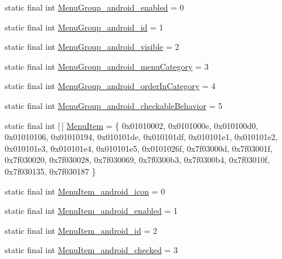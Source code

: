 \begin{DoxyCompactItemize}
\item 
static final int \mbox{\hyperlink{classcom_1_1google_1_1android_1_1gms_1_1R_1_1styleable_a0d0d93ce83d33ae85f11bd37a00a0e97}{Menu\+Group\+\_\+android\+\_\+enabled}} = 0
\item 
static final int \mbox{\hyperlink{classcom_1_1google_1_1android_1_1gms_1_1R_1_1styleable_a0241e87972e95cdfb6fa2d8509b2a525}{Menu\+Group\+\_\+android\+\_\+id}} = 1
\item 
static final int \mbox{\hyperlink{classcom_1_1google_1_1android_1_1gms_1_1R_1_1styleable_a8642e3016f1d1a7b9fb7c67e0c444eb4}{Menu\+Group\+\_\+android\+\_\+visible}} = 2
\item 
static final int \mbox{\hyperlink{classcom_1_1google_1_1android_1_1gms_1_1R_1_1styleable_a2859c9f2a2b60b943ef88d02bb61e9d7}{Menu\+Group\+\_\+android\+\_\+menu\+Category}} = 3
\item 
static final int \mbox{\hyperlink{classcom_1_1google_1_1android_1_1gms_1_1R_1_1styleable_abb8290ec3f838084d0e7e2f9d9672006}{Menu\+Group\+\_\+android\+\_\+order\+In\+Category}} = 4
\item 
static final int \mbox{\hyperlink{classcom_1_1google_1_1android_1_1gms_1_1R_1_1styleable_af4112e6aae6cbf95ad1482e7c0ccd433}{Menu\+Group\+\_\+android\+\_\+checkable\+Behavior}} = 5
\item 
static final int \mbox{[}$\,$\mbox{]} \mbox{\hyperlink{classcom_1_1google_1_1android_1_1gms_1_1R_1_1styleable_a7c676b544f8b0bffbf835502234a7e76}{Menu\+Item}} = \{ 0x01010002, 0x0101000e, 0x010100d0, 0x01010106, 0x01010194, 0x010101de, 0x010101df, 0x010101e1, 0x010101e2, 0x010101e3, 0x010101e4, 0x010101e5, 0x0101026f, 0x7f03000d, 0x7f03001f, 0x7f030020, 0x7f030028, 0x7f030069, 0x7f0300b3, 0x7f0300b4, 0x7f03010f, 0x7f030135, 0x7f030187 \}
\item 
static final int \mbox{\hyperlink{classcom_1_1google_1_1android_1_1gms_1_1R_1_1styleable_a2782035c48daea648fd5e9d8ff9679d6}{Menu\+Item\+\_\+android\+\_\+icon}} = 0
\item 
static final int \mbox{\hyperlink{classcom_1_1google_1_1android_1_1gms_1_1R_1_1styleable_ac7d5804c964342b5bf9b2e9257d050c4}{Menu\+Item\+\_\+android\+\_\+enabled}} = 1
\item 
static final int \mbox{\hyperlink{classcom_1_1google_1_1android_1_1gms_1_1R_1_1styleable_ad07d6838f7c07af7720d1d72bc679610}{Menu\+Item\+\_\+android\+\_\+id}} = 2
\item 
static final int \mbox{\hyperlink{classcom_1_1google_1_1android_1_1gms_1_1R_1_1styleable_aa75a42d80a7dc66b4abdaf919a72906a}{Menu\+Item\+\_\+android\+\_\+checked}} = 3

\end{DoxyCompactItemize}
